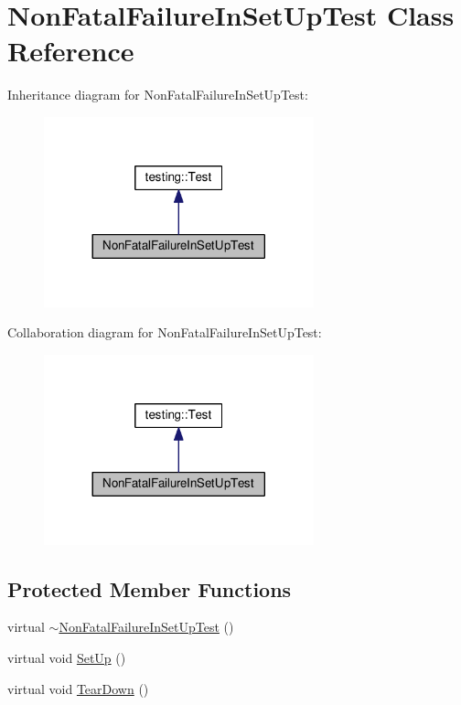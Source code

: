 \hypertarget{classNonFatalFailureInSetUpTest}{}\section{Non\+Fatal\+Failure\+In\+Set\+Up\+Test Class Reference}
\label{classNonFatalFailureInSetUpTest}


Inheritance diagram for Non\+Fatal\+Failure\+In\+Set\+Up\+Test\+:\nopagebreak
\begin{figure}[H]
\begin{center}
\leavevmode
\includegraphics[width=221pt]{classNonFatalFailureInSetUpTest__inherit__graph}
\end{center}
\end{figure}


Collaboration diagram for Non\+Fatal\+Failure\+In\+Set\+Up\+Test\+:\nopagebreak
\begin{figure}[H]
\begin{center}
\leavevmode
\includegraphics[width=221pt]{classNonFatalFailureInSetUpTest__coll__graph}
\end{center}
\end{figure}
\subsection*{Protected Member Functions}
\begin{DoxyCompactItemize}
\item 
virtual \hyperlink{classNonFatalFailureInSetUpTest_ae4b4ee1812e3427cf82b155256547442}{$\sim$\+Non\+Fatal\+Failure\+In\+Set\+Up\+Test} ()
\item 
virtual void \hyperlink{classNonFatalFailureInSetUpTest_ae24c724bae1fcd2601f58fa9c26adca3}{Set\+Up} ()
\item 
virtual void \hyperlink{classNonFatalFailureInSetUpTest_a36abc808b11afc6a9bfa20dac5c28c30}{Tear\+Down} ()
\end{DoxyCompactItemize}
